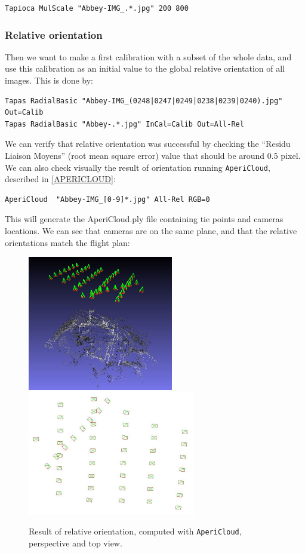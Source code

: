 \begin{verbatim}
Tapioca MulScale "Abbey-IMG_.*.jpg" 200 800
\end{verbatim}


\subsubsection{Relative orientation}

Then we want to make a first calibration with a subset of the whole data, and
use this calibration as an initial value to the global relative orientation of all images. This is done by:

\begin{verbatim}
Tapas RadialBasic "Abbey-IMG_(0248|0247|0249|0238|0239|0240).jpg" Out=Calib
Tapas RadialBasic "Abbey-.*.jpg" InCal=Calib Out=All-Rel
\end{verbatim}

We can verify that relative orientation was successful by checking the ``Residu Liaison Moyens'' (root mean square error) value that should be around 0.5 pixel.
We can also check visually the result of orientation running {\tt AperiCloud}, described in \ref{APERICLOUD}:

\begin{verbatim}
AperiCloud  "Abbey-IMG_[0-9]*.jpg" All-Rel RGB=0
\end{verbatim}

This will generate the AperiCloud.ply file containing tie points and cameras locations. We can see that cameras are on the same plane, and that the relative orientations match the flight
plan:

\begin{figure}[H]
\begin{center}
\includegraphics[width=180pt]{FIGS/Cuxa/AperiCloud.jpg}
\includegraphics[width=208pt]{FIGS/Cuxa/Aero.jpg}
\caption{Result of relative orientation, computed with {\tt AperiCloud}, perspective and top view.}
\end{center}
\end{figure}

